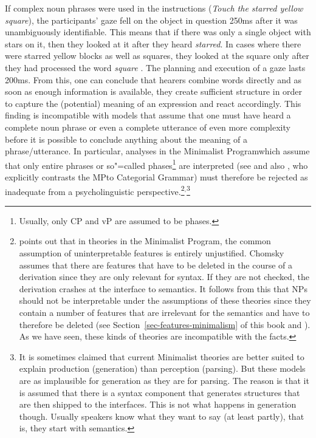 \addlines
If complex noun phrases were used in the instructions (\emph{Touch the starred yellow
  square}), the participants' gaze fell on the object in question 250ms after it was unambiguously identifiable.
  This means that if there was only a single object with stars on it, then they looked at it after they heard
  \emph{starred}. In cases where there were starred yellow blocks as well as squares, they looked at the square
  only after they had processed the word \emph{square} \citep[]{TSKES95a}.
The planning and execution of a gaze lasts 200ms. From this, one can conclude that hearers combine words directly
and as soon as enough information is available, they create sufficient structure in order to capture
the (potential) meaning of an expression and react accordingly.
This finding is incompatible with models that assume that one must have heard a complete noun phrase or even a complete utterance
of even more complexity before it is possible to conclude anything about the meaning of a phrase/utterance. 
In particular, analyses in the Minimalist Program\indexmp which assume that only entire phrases or so"=called phases\footnote{%
     Usually, only CP and vP are assumed to be phases.
}
are interpreted (see \citealp{Chomsky99a} and also \citealp[]{Marantz2005a}, who explicitly contrasts the
MP\indexmp to Categorial Grammar\indexcg) must therefore be rejected as inadequate from a psycholinguistic perspective.\footnote{%
\citet[--730]{Sternefeld2006a-u} points out that in theories in the Minimalist Program, the common assumption of uninterpretable
features is entirely unjustified. Chomsky assumes that there are features that have to be deleted in the course of a derivation
since they are only relevant for syntax. If they are not checked, the derivation crashes at the interface to semantics.
It follows from this that NPs should not be interpretable under the assumptions of these theories since they contain a number of features
that are irrelevant for the semantics and have to therefore be deleted (see
Section~\ref{sec-features-minimalism} of this book and \citealp{Richards2015a}).
As we have seen, these kinds of theories are incompatible with the facts.
}$^,$\footnote{%
  It is sometimes claimed that current Minimalist theories are better suited to explain production (generation)
  than perception (parsing). But these models are as implausible for generation as they are for parsing. The
  reason is that it is assumed that there is a syntax component that generates structures that are
  then shipped to the interfaces. This is not what happens in generation though. Usually speakers
  know what they want to say (at least partly), that is, they start with semantics.
}

